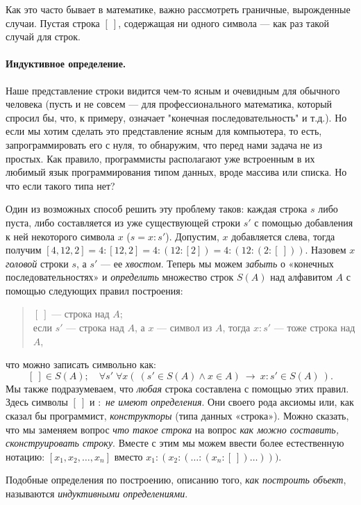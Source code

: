 \documentclass[12pt,notitlepage]{article}
\theoremstyle{plain}
\theoremstyle{definition}
\theoremstyle{plain}
\newcommand{\1}{\mathbf{1}}
\newcommand{\0}{\mathbf{0}}
\begin{document}
Как это часто бывает в математике, важно рассмотреть граничные, вырожденные случаи. Пустая строка $[\ ]$, содержащая ни одного символа --- как раз такой случай для строк.

\paragraph{Индуктивное определение.} Наше представление строки видится чем-то ясным и очевидным для обычного человека (пусть и не совсем --- для профессионального математика, который спросил бы, что, к примеру, означает "конечная последовательность" и т.д.). Но если мы хотим сделать это представление ясным для компьютера, то есть, запрограммировать его с нуля, то обнаружим, что перед нами задача не из простых. Как правило, программисты располагают уже встроенным в их любимый язык программирования типом данных, вроде массива или списка. Но что если такого типа нет?

Один из возможных способ решить эту проблему таков: каждая строка $s$ либо пуста, либо составляется из уже существующей строки $s'$ с помощью добавления к ней некоторого символа $x$ ($s = x : s'$). Допустим, $x$ добавляется слева, тогда получим $[4,12, 2] = 4 : [12, 2] = 4 : (12 : [2]) = 4 : (12 : (2 : [\ ]))$. Назовем $x$ \emph{головой} строки $s$, а $s'$ --- ее \emph{хвостом}. Теперь мы можем \emph{забыть} о «конечных последовательностях» и \emph{определить} множество строк $S(A)$ над алфавитом $A$ с помощью следующих правил построения:
\begin{quote}
	$[\ ]$ --- строка над $A$;\\
	если $s'$ --- строка над $A$, а $x$ --- символ из $A$, тогда $x : s'$ --- тоже строка над $A$,
\end{quote}
что можно записать символьно как:
$$[\ ] \in S(A);\quad \forall s'\; \forall x \left(\ (s' \in  S(A) \wedge  x \in A)\ \to\ x : s' \in S(A)\  \right).$$
Мы также подразумеваем, что \emph{любая} строка составлена с помощью этих правил. Здесь символы $[\ ]$ и $:$ \emph{не имеют определения}. Они своего рода аксиомы или, как сказал бы программист, \emph{конструкторы} (типа данных «строка»). Можно сказать, что мы заменяем вопрос \emph{что такое строка} на вопрос \emph{как можно составить, сконструировать строку}. Вместе с этим мы можем ввести более естественную нотацию: $[x_1, x_2, \ldots, x_n]$ вместо $x_1 : (x_2 : (\ldots : (x_n : [\ ])\ldots)))$.

Подобные определения по построению, описанию того, \emph{как построить объект}, называются \emph{индуктивными определениями}.
\end{document}
